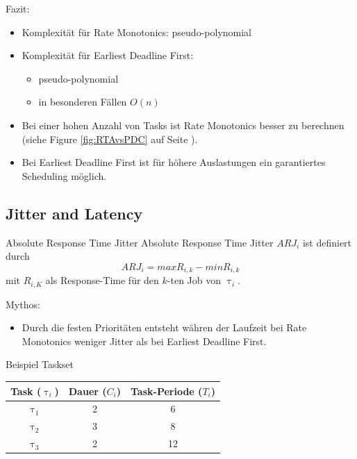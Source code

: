 \newpage
\begin{frame}{Fazit:}
	\begin{itemize}
		\item Komplexität für Rate Monotonics: pseudo-polynomial
		\item Komplexität für Earliest Deadline First:
		\begin{itemize}
			\item pseudo-polynomial
			\item in besonderen Fällen $O(n)$
		\end{itemize}
		\item Bei einer hohen Anzahl von Tasks ist Rate Monotonics besser zu berechnen (siehe Figure \ref{fig:RTAvsPDC} auf Seite \pageref{fig:RTAvsPDC}).
		\item Bei Earliest Deadline First ist für höhere Auslastungen ein garantiertes Scheduling möglich.
	\end{itemize}
\end{frame}



\subsection{Jitter and Latency}\label{JitterandLatency}

\begin{frame}{Absolute Response Time Jitter}
	Absolute Response Time Jitter $ARJ_i$ ist definiert durch
	\begin{equation}
		ARJ_i=max R_{i,k}-min R_{i,k}
	\end{equation} mit
	$R_{i,K}$ als Response-Time für den $k$-ten Job von $\uptau_i$.
\end{frame}

\begin{frame}{Mythos:}
	\begin{itemize}
		\item Durch die festen Prioritäten entsteht währen der Laufzeit bei Rate Monotonics weniger Jitter als bei Earliest Deadline First. 
	\end{itemize}
\end{frame}

\begin{frame}{Beispiel Taskset}
	\begin{center}
		\begin{tabular}{c||c|c}
			Task ($\uptau_i$) & Dauer ($C_i$) & Task-Periode ($T_i$)\\\hline\hline
			$\uptau_1$ & 2 & 6\\
			$\uptau_2$ & 3 & 8\\
			$\uptau_3$ & 2 & 12
		\end{tabular}	
	\end{center}
\end{frame}

